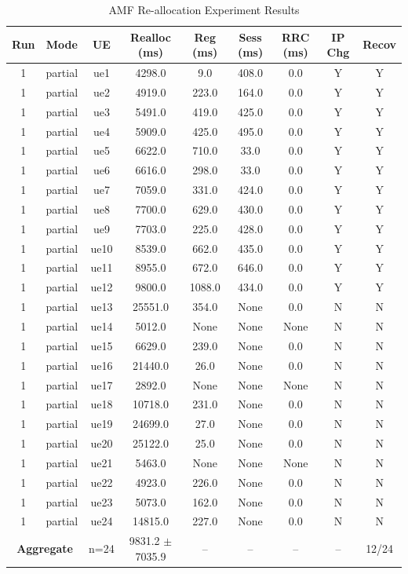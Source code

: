 \begin{table}[ht]
\centering
\begin{tabular}{|c|c|c|c|c|c|c|c|c|}
\hline
Run & Mode & UE & Realloc (ms) & Reg (ms) & Sess (ms) & RRC (ms) & IP Chg & Recov \\
\hline
1 & partial & ue1 & 4298.0 & 9.0 & 408.0 & 0.0 & Y & Y \\
1 & partial & ue2 & 4919.0 & 223.0 & 164.0 & 0.0 & Y & Y \\
1 & partial & ue3 & 5491.0 & 419.0 & 425.0 & 0.0 & Y & Y \\
1 & partial & ue4 & 5909.0 & 425.0 & 495.0 & 0.0 & Y & Y \\
1 & partial & ue5 & 6622.0 & 710.0 & 33.0 & 0.0 & Y & Y \\
1 & partial & ue6 & 6616.0 & 298.0 & 33.0 & 0.0 & Y & Y \\
1 & partial & ue7 & 7059.0 & 331.0 & 424.0 & 0.0 & Y & Y \\
1 & partial & ue8 & 7700.0 & 629.0 & 430.0 & 0.0 & Y & Y \\
1 & partial & ue9 & 7703.0 & 225.0 & 428.0 & 0.0 & Y & Y \\
1 & partial & ue10 & 8539.0 & 662.0 & 435.0 & 0.0 & Y & Y \\
1 & partial & ue11 & 8955.0 & 672.0 & 646.0 & 0.0 & Y & Y \\
1 & partial & ue12 & 9800.0 & 1088.0 & 434.0 & 0.0 & Y & Y \\
1 & partial & ue13 & 25551.0 & 354.0 & None & 0.0 & N & N \\
1 & partial & ue14 & 5012.0 & None & None & None & N & N \\
1 & partial & ue15 & 6629.0 & 239.0 & None & 0.0 & N & N \\
1 & partial & ue16 & 21440.0 & 26.0 & None & 0.0 & N & N \\
1 & partial & ue17 & 2892.0 & None & None & None & N & N \\
1 & partial & ue18 & 10718.0 & 231.0 & None & 0.0 & N & N \\
1 & partial & ue19 & 24699.0 & 27.0 & None & 0.0 & N & N \\
1 & partial & ue20 & 25122.0 & 25.0 & None & 0.0 & N & N \\
1 & partial & ue21 & 5463.0 & None & None & None & N & N \\
1 & partial & ue22 & 4923.0 & 226.0 & None & 0.0 & N & N \\
1 & partial & ue23 & 5073.0 & 162.0 & None & 0.0 & N & N \\
1 & partial & ue24 & 14815.0 & 227.0 & None & 0.0 & N & N \\
\multicolumn{2}{|c|}{\textbf{Aggregate}} & n=24 & 9831.2 $\pm$ 7035.9 & -- & -- & -- & -- & 12/24 \\
\hline
\end{tabular}
\caption{AMF Re-allocation Experiment Results}
\label{tab:amf_realloc}
\end{table}

